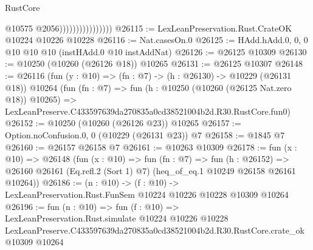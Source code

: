 \begin{lexlean}{RustCore}
\begin{coremodule}
                                    @10575
                                    @2056))))))))))))))))
@26115 := LexLeanPreservation.Rust.CrateOK @10224 @10226 @10228
@26116 := Nat.casesOn.{0}
@26125 := HAdd.hAdd.{0, 0, 0} @10 @10 @10 (instHAdd.{0} @10 instAddNat)
@26126 := @26125 @10309
@26130 := @10250 (@10260 (@26126 @18)) @10265
@26131 := @26125 @10307
@26148 := @26116
    (fun (y : @10) => (fn : @7) -> (h : @26130) -> @10229 (@26131 @18))
    @10264
    (fun (fn : @7) =>
    fun (h : @10250 (@10260 (@26125 Nat.zero @18)) @10265) =>
    LexLeanPreserve.C433597639da270835a0cd38521004b2d.R30.RustCore.fun0)
@26152 := @10250 (@10260 (@26126 @23)) @10265
@26157 := Option.noConfusion.{0, 0} (@10229 (@26131 @23)) @7
@26158 := @1845 @7
@26160 := @26157 @26158 @7
@26161 := @10263 @10309
@26178 := fun (x : @10) =>
  @26148
    (fun (x : @10) =>
    fun (fn : @7) =>
    fun (h : @26152) =>
    @26160 @26161 (Eq.refl.{2} (Sort 1) @7) (heq_of_eq.{1} @10249 @26158 @26161 @10264))
@26186 := (n : @10) ->
  (f : @10) -> LexLeanPreservation.Rust.FunSem @10224 @10226 @10228 @10309 @10264
@26196 := fun (n : @10) =>
  fun (f : @10) =>
  LexLeanPreservation.Rust.simulate
    @10224
    @10226
    @10228
    LexLeanPreserve.C433597639da270835a0cd38521004b2d.R30.RustCore.crate_ok
    @10309
    @10264
\end{coremodule}
\end{lexlean}

